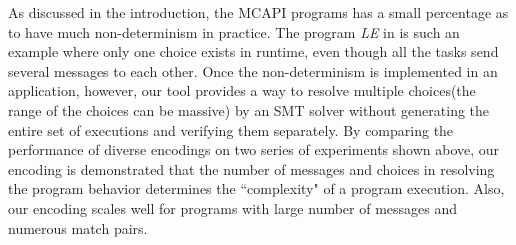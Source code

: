 As discussed in the introduction, the MCAPI programs has a small percentage as to have much non-determinism in practice. The program \textit{LE} in  is such an example where only one choice exists in runtime, even though all the tasks send several messages to each other. Once the non-determinism is implemented in an application, however, our tool provides a way to resolve multiple choices(the range of the choices can be massive) by an SMT solver without generating the entire set of executions and verifying them separately. By comparing the performance of diverse encodings on two series of experiments shown above, our encoding is demonstrated that the number of messages and choices in resolving the program behavior determines the ``complexity" of a program execution. Also, our encoding scales well for programs with large number of messages and numerous match pairs.

